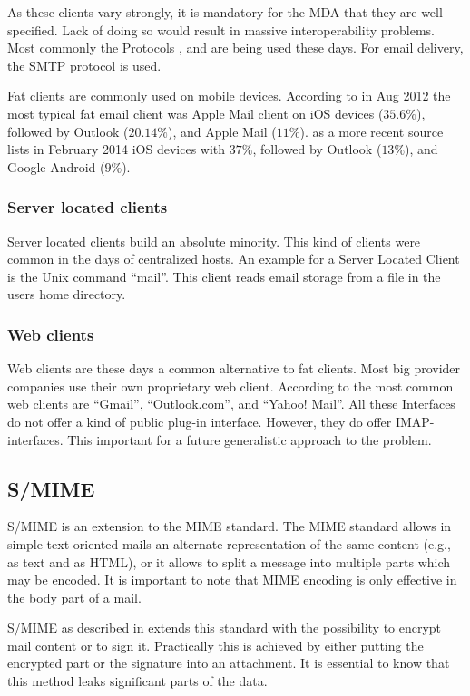 As these clients vary strongly, it is mandatory for the MDA that they are well specified. Lack of doing so would result in massive interoperability problems. Most commonly the Protocols ,  and  are being used these days. For email delivery, the SMTP protocol is used. 

Fat clients are commonly used on mobile devices. According to  \cite{clientDistribution} in Aug 2012 the most typical fat email client was Apple Mail client on iOS devices ($35.6\%$), followed by Outlook ($20.14\%$), and Apple Mail ($11\%$). \cite{clientDistribution2} as a more recent source lists in February 2014 iOS devices with $37\%$, followed by Outlook ($13\%$), and  Google Android ($9\%$).

\subsubsection{Server located clients}
Server located clients build an absolute minority. This kind of clients were common in the days of centralized hosts. An example for a Server Located Client is the Unix command ``mail''. This client reads email storage from a file in the users home directory.

\subsubsection{Web clients}
Web clients are these days a common alternative to fat clients. Most big provider companies use their own proprietary web client. According to \cite{clientDistribution2} the most common web clients are "`Gmail"', "`Outlook.com"', and "`Yahoo! Mail"'. All these Interfaces do not offer a kind of public plug-in interface. However,  they do offer IMAP-interfaces. This important for a future generalistic approach to the problem.

\subsection{S/MIME}
S/MIME is an extension to the MIME standard. The MIME standard allows in simple text-oriented mails an alternate representation of the same content (e.g., as text and as HTML), or it allows to split a message into multiple parts which may be encoded. It is important to note that MIME encoding is only effective in the body part of a mail.

S/MIME as described in \cite{RFC3851} extends this standard with the possibility to encrypt mail content or to sign it. Practically this is achieved by either putting the encrypted part or the signature into an attachment. It is essential to know that this method leaks significant parts of the data.

